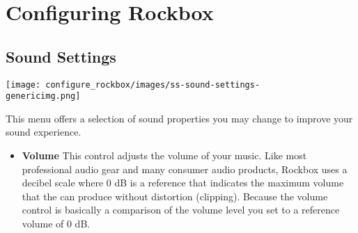 \chapter{Configuring Rockbox}
\label{ref:configure_rockbox}
\section{Sound Settings}
\begin{center}
\texttt{[image: configure\_rockbox/images/ss-sound-settings-\\genericimg.png]}
\end{center}

This menu offers a selection of sound properties you may change to improve your sound experience.

\begin{itemize}
\item \textbf{Volume}
  This control adjusts the volume of your music.  Like most professional audio gear and many consumer audio products, Rockbox uses a decibel scale where 0 dB is a reference that indicates the maximum volume that the \dap can produce without distortion (clipping).  Because the volume control is basically a comparison of the volume level you set to a reference volume of 0 dB.


\end{itemize}
